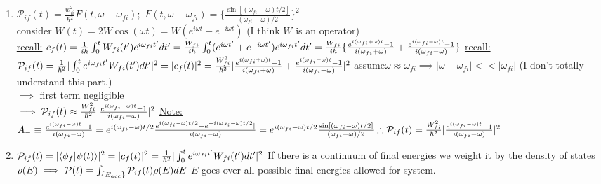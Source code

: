 \documentclass[12pt]{amsart}
\begin{document}
\begin{enumerate}
\item \underline{$\mathcal{P}_{if}(t) = \frac{w_{fi}^2}{\hbar^2} F(t, \omega- \omega_{fi});\,\, F(t, \omega - \omega_{fi}) = \{ \frac{\sin[ (\omega_{fi} - \omega) t/2]}{( \omega_{fi} - \omega)/2} \}^2$}\\
consider $W(t) = 2 W \cos (\omega t) = W( e^{i \omega t} + e^{- i \omega t})$ (I think $W$ is an operator)\\
\underline{recall:} $c_f(t) = \frac{1}{i \hbar} \int_0^t W_{fi}(t') e^{i \omega_{fi} t'} d t'\\
= \frac{W_{fi}}{i \hbar} \int_0^t ( e^{i \omega t'} + e^{- i \omega t'}) e^{i \omega_{fi} t'} dt'\\
= \frac{W_{fi}}{i \hbar} \{ \frac{e^{i( \omega_{fi} + \omega)t} - 1}{i ( \omega_{fi} + \omega)} + \frac{e^{i( \omega_{fi} - \omega)t} - 1}{i ( \omega_{fi} - \omega)} \} \\$
\underline{recall:} $\mathcal{P}_{if} (t) = \frac{1}{\hbar^2} | \int_0^t e^{i \omega_{fi} t'} W_{fi} (t') dt' |^2
= |c_f(t)|^2\\
= \frac{W_{fi}^2}{\hbar^2} | \frac{e^{i ( \omega_{fi} + \omega)t} -1}{i( \omega_{fi} + \omega)} + \frac{e^{i( \omega_{fi} - \omega) t} -1}{i ( \omega_{fi} - \omega)} |^2\\$
assume$ \omega \approx \omega_{fi} \implies | \omega - \omega_{fi} | << | \omega_{fi} |$ (I don't totally understand this part.)\\
$\implies$ first term negligible\\
$\implies \mathcal{P}_{if} (t) \approx \frac{W_{fi}^2}{\hbar^2} | \frac{e^{i ( \omega_{fi} - \omega) t} -1}{i ( \omega_{fi} - \omega)}|^2\\$
\underline{Note:} $A_- \equiv \frac{e^{i( \omega_{fi} - \omega) t} - 1}{i ( \omega_{fi} - \omega)}\\
= e^{i ( \omega_{fi} - \omega) t/2} \frac{e^{i( \omega_{fi} - \omega)t/2} - e^{-i ( \omega_{fi} - \omega) t/2}|}{i( \omega_{fi} - \omega)}\\
= e^{i( \omega_{fi} - \omega)t/2} \frac{\sin[ ( \omega_{fi} - \omega) t/2]}{( \omega_{fi} - \omega) /2}\\
\therefore \mathcal{P}_{if} (t) = \frac{W_{fi}^2}{\hbar^2} | \frac{e^{i( \omega_{fi} - \omega) t} - 1}{i ( \omega_{fi} - \omega)}|^2\\$


\hdashrule[0.5ex][c]{\linewidth}{0.5pt}{1.5mm}


\item $\mathcal{P}_{if}(t) = | \langle \phi_f | \psi(t) \rangle |^2 = | c_f(t) |^2 = \frac{1}{\hbar^2} | \int_0^t e^{i \omega_{fi} t'} W_{fi}(t') dt' |^2\\$
If there is a continuum of final energies we weight it by the density of states $\rho(E)\\
\implies \mathcal{P}(t) = \int_{\{E_{acc} \}} \mathcal{P}_{if} (t) \rho(E) dE\\$
$E$ goes over all possible final energies allowed for system.



\end{enumerate}
\end{document}
